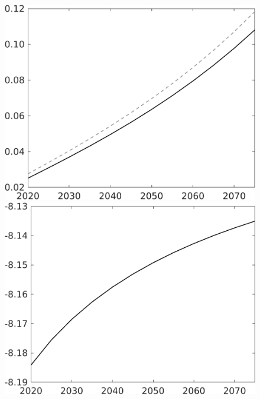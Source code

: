 \documentclass[12pt]{article}
\begin{document}
\begin{figure}[h!!]
\begin{minipage}[]{0.32\textwidth}
	\end{minipage}	
	\begin{minipage}[]{0.32\textwidth}
		\includegraphics[width=1\textwidth]{../../codding_model/own_basedOnFried/optimalPol_010922_revision/figures/all_13Sept22/CompTaul_Equlab_LFBAU_Reg0_G_spillover0_nsk0_xgr1_knspil0_sep1_countec0_GovRev0_etaa0.79_lgd0.png}
	\end{minipage}	
	\begin{minipage}[]{0.32\textwidth}
		\includegraphics[width=1\textwidth]{../../codding_model/own_basedOnFried/optimalPol_010922_revision/figures/all_13Sept22/CompTaul_Equlab_LFBAUPer_Reg0_F_spillover0_nsk0_xgr1_knspil0_sep1_countec0_GovRev0_etaa0.79.png}

\end{minipage}
\end{figure}
\end{document}
